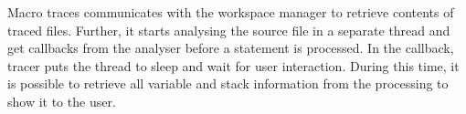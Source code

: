 Macro traces communicates with the workspace manager to retrieve contents of traced files. Further, it starts analysing the source file in a separate thread and get callbacks from the analyser before a statement is processed. In the callback, tracer puts the thread to sleep and wait for user interaction. During this time, it is possible to retrieve all variable and stack information from the processing to show it to the user.
